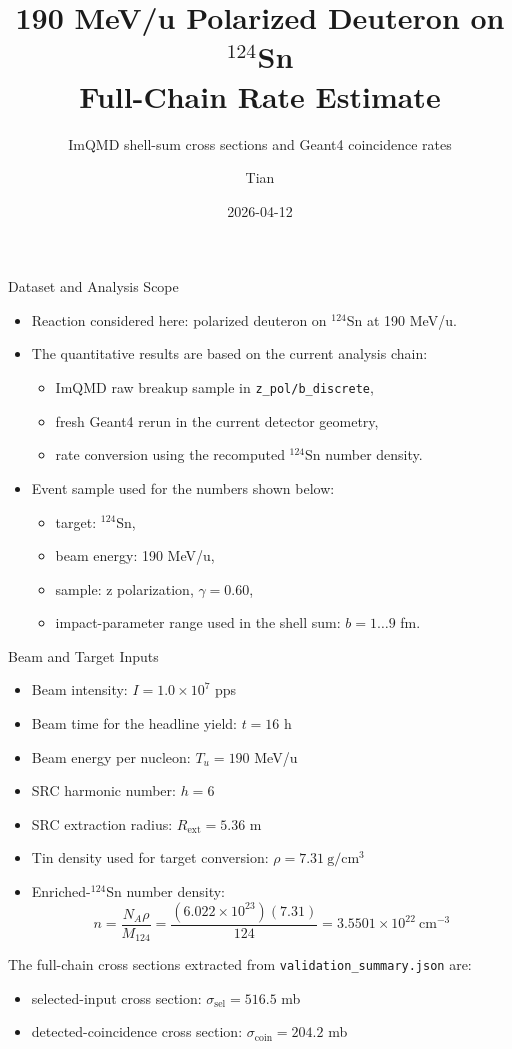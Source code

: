 \documentclass[aspectratio=169]{beamer}
\title[190 MeV/u d on Sn124]{190 MeV/u Polarized Deuteron on $^{124}$Sn\\Full-Chain Rate Estimate}
\subtitle{ImQMD shell-sum cross sections and Geant4 coincidence rates}
\author{Tian}
\date{2026-04-12}
\begin{document}
\begin{frame}
\titlepage
\end{frame}

\begin{frame}{Dataset and Analysis Scope}
\small
\begin{itemize}
  \item Reaction considered here: polarized deuteron on $^{124}$Sn at 190 MeV/u.
  \item The quantitative results are based on the current analysis chain:
  \begin{itemize}
    \item ImQMD raw breakup sample in \texttt{z\_pol/b\_discrete},
    \item fresh Geant4 rerun in the current detector geometry,
    \item rate conversion using the recomputed $^{124}$Sn number density.
  \end{itemize}
  \item Event sample used for the numbers shown below:
  \begin{itemize}
    \item target: $^{124}$Sn,
    \item beam energy: 190 MeV/u,
    \item sample: z polarization, $\gamma = 0.60$,
    \item impact-parameter range used in the shell sum: $b = 1 \ldots 9$ fm.
  \end{itemize}
\end{itemize}
\end{frame}

\begin{frame}{Beam and Target Inputs}
\small
\begin{itemize}
  \item Beam intensity: $I = 1.0\times 10^7$ pps
  \item Beam time for the headline yield: $t = 16$ h
  \item Beam energy per nucleon: $T_u = 190$ MeV/u
  \item SRC harmonic number: $h = 6$
  \item SRC extraction radius: $R_{\mathrm{ext}} = 5.36$ m
  \item Tin density used for target conversion: $\rho = 7.31~\mathrm{g/cm^3}$
  \item Enriched-$^{124}$Sn number density:
  \[
  n = \frac{N_A \rho}{M_{124}} =
  \frac{(6.022\times 10^{23})(7.31)}{124}
  = 3.5501\times 10^{22}~\mathrm{cm^{-3}}
  \]
\end{itemize}

\vspace{0.1cm}
\small
The full-chain cross sections extracted from \texttt{validation\_summary.json} are:
\begin{itemize}
  \item selected-input cross section: $\sigma_{\mathrm{sel}} = 516.5$ mb
  \item detected-coincidence cross section: $\sigma_{\mathrm{coin}} = 204.2$ mb
\end{itemize}
\end{frame}
\end{document}
